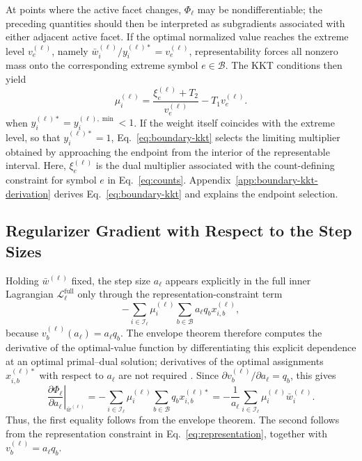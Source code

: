 \documentclass{article}
\begin{document}
At points where the active facet changes, $\Phi_\ell$ may be nondifferentiable;
the preceding quantities should then be interpreted as subgradients 
associated with either adjacent active facet. 
If the optimal normalized value reaches the extreme level
$v_e^{(\ell)}$, namely
$\bar w_i^{(\ell)}/y_i^{(\ell)*}=v_e^{(\ell)}$, representability forces all
nonzero mass onto the corresponding extreme symbol $e\in\mathcal B$. The KKT
conditions then yield
\begin{equation}
  \mu_i^{(\ell)}
  =
  \frac{\xi_e^{(\ell)}+T_2}{v_e^{(\ell)}}
  -T_1v_e^{(\ell)}.
  \label{eq:boundary-kkt}
\end{equation}
when $y_i^{(\ell)*}=y_i^{(\ell),\min}<1$. If the weight itself coincides with
the extreme level, so that $y_i^{(\ell)*}=1$, Eq.~\eqref{eq:boundary-kkt}
selects the limiting multiplier obtained by approaching the endpoint from the
interior of the representable interval. Here, $\xi_e^{(\ell)}$ is the dual
multiplier associated with the count-defining constraint for symbol $e$ in
Eq.~\eqref{eq:counts}. Appendix~\ref{app:boundary-kkt-derivation} derives
Eq.~\eqref{eq:boundary-kkt} and explains the endpoint selection.


\subsection{Regularizer Gradient with Respect to the Step Sizes}
\label{app:scale-grad}
\label{app:scale-gradient}
\label{sec:regularizer-step-gradient}

Holding $\bar w^{(\ell)}$ fixed, the step size $a_\ell$ appears explicitly in
the full inner Lagrangian $\mathscr L_\ell^{\mathrm{full}}$ only through the
representation-constraint term
\[
  -\sum_{i\in\mathcal I_\ell}
   \mu_i^{(\ell)}
   \sum_{b\in\mathcal B}
   a_\ell q_bx_{i,b}^{(\ell)},
\]
because $v_b^{(\ell)}(a_\ell)=a_\ell q_b$. The envelope theorem therefore
computes the derivative of the optimal-value function by differentiating this
explicit dependence at an optimal primal--dual solution; derivatives of the
optimal assignments $x_{i,b}^{(\ell)*}$ with respect to $a_\ell$ are not
required \citep{bonnans2000perturbation}. Since
$\partial v_b^{(\ell)}/\partial a_\ell=q_b$, this gives
\begin{equation}
  \left.
  \frac{\partial\Phi_\ell}{\partial a_\ell}
  \right|_{\bar w^{(\ell)}}
  =
  -\sum_{i\in\mathcal I_\ell}
   \mu_i^{(\ell)}
   \sum_{b\in\mathcal B}
   q_bx_{i,b}^{(\ell)*}
  =
  -\frac{1}{a_\ell}
   \sum_{i\in\mathcal I_\ell}
   \mu_i^{(\ell)}\bar w_i^{(\ell)}.
  \label{eq:app-scale-envelope}
\end{equation}
Thus, the first equality follows from the envelope theorem. The second follows
from the representation constraint in Eq.~\eqref{eq:representation}, together
with $v_b^{(\ell)}=a_\ell q_b$.
\end{document}
